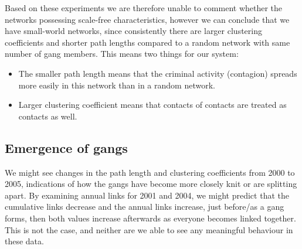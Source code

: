 \documentclass[conference]{IEEEtran}
\theoremstyle{definition}
\begin{document}
\begin{table}[htb]
\caption{Power law exponents for gangs, against years (significant results are shown in bold).}
\label{tab:clausetgangyears}
\end{table}

Based on these experiments we are therefore unable to comment whether
the networks possessing scale-free characteristics, however we can
conclude that we have small-world networks, since consistently there
are larger clustering coefficients and shorter path lengths compared
to a random network with same number of gang members. This means two
things for our system:

\begin{itemize}
\item The smaller path length means that the criminal activity
(contagion) spreads more easily in this network than in a random
network.
\item Larger clustering coefficient means that contacts of contacts
are treated as contacts as well.
\end{itemize}


\subsection{Emergence of gangs}\label{sec:emergence}
We might see changes in the path length and clustering
coefficients from 2000 to 2005, indications of how the gangs have
become more closely knit or are splitting apart. By examining annual
links for 2001 and 2004, we might predict that the cumulative links
decrease and the annual links increase, just before/as a gang forms,
then both values increase afterwards as everyone becomes linked
together. This is not the case, and neither are we able to see any
meaningful behaviour in these data.
\end{document}
